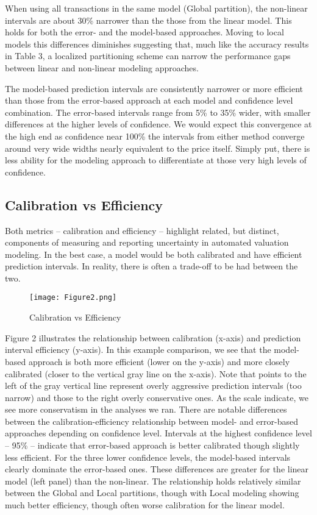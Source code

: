\documentclass[colTwo]{anon}
\theoremstyle{definition}
\begin{document}
When using all transactions in the same model (Global partition), the non-linear intervals are about 30\% narrower than the those from the linear model.  This holds for both the error- and the model-based approaches. Moving to local models this differences diminishes suggesting that, much like the accuracy results in Table 3, a localized partitioning scheme can narrow the performance gaps between linear and non-linear modeling approaches.

The model-based prediction intervals are consistently narrower or more efficient than those from the error-based approach at each model and confidence level combination. The error-based intervals range from 5\% to 35\% wider, with smaller differences at the higher levels of confidence.  We would expect this convergence at the high end as confidence near 100\% the intervals from either method converge around very wide widths nearly equivalent to the price itself.  Simply put, there is less ability for the modeling approach to differentiate at those very high levels of confidence.

\subsection{Calibration vs Efficiency}

Both metrics -- calibration and efficiency -- highlight related, but distinct, components of measuring and reporting uncertainty in  automated valuation modeling.  In the best case, a model would be both calibrated and have efficient prediction intervals. In reality, there is often a trade-off to be had between the two.

\begin{figure*}[h!]
\centering
\texttt{[image: Figure2.png]}
\caption{Calibration vs Efficiency}
\label{fig:calibsens}
\end{figure*}

Figure 2 illustrates the relationship between calibration (x-axis) and prediction interval efficiency (y-axis). In this example comparison, we see that the model-based approach is both more efficient (lower on the y-axis) and more closely calibrated (closer to the vertical gray line on the x-axis). Note that points to the left of the gray vertical line represent overly aggressive prediction intervals (too narrow) and those to the right overly conservative ones.  As the scale indicate, we see more conservatism in the analyses we ran.
There are notable differences between the calibration-efficiency relationship between model- and error-based approaches depending on confidence level.  Intervals at the highest confidence level -- 95\% -- indicate that error-based approach is better calibrated though slightly less efficient. For the three lower confidence levels, the model-based intervals clearly dominate the error-based ones. These differences are greater for the linear model (left panel) than the non-linear.  The relationship holds relatively similar between the Global and Local partitions, though with Local modeling showing much better efficiency, though often worse calibration for the linear model.
\end{document}
